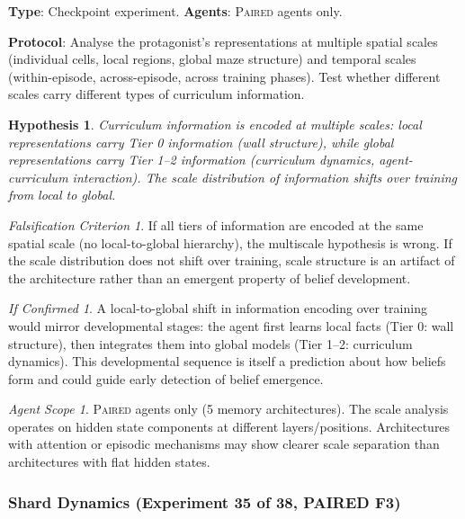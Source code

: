\documentclass[11pt,a4paper]{article}
\newtheorem{hypothesis}{Hypothesis}[subsection]
\theoremstyle{remark}
\newtheorem*{falsification}{Falsification Criterion}
\newtheorem*{implication}{If Confirmed}
\newtheorem*{agentscope}{Agent Scope}
\newcommand{\paired}{\textsc{Paired}}
\begin{document}
\textbf{Type}: Checkpoint experiment. \textbf{Agents}: \paired{} agents only.

\textbf{Protocol}: Analyse the protagonist's representations at multiple spatial scales (individual cells, local regions, global maze structure) and temporal scales (within-episode, across-episode, across training phases). Test whether different scales carry different types of curriculum information.

\begin{hypothesis}
Curriculum information is encoded at multiple scales: local representations carry Tier 0 information (wall structure), while global representations carry Tier 1--2 information (curriculum dynamics, agent-curriculum interaction). The scale distribution of information shifts over training from local to global.
\end{hypothesis}

\begin{falsification}
If all tiers of information are encoded at the same spatial scale (no local-to-global hierarchy), the multiscale hypothesis is wrong. If the scale distribution does not shift over training, scale structure is an artifact of the architecture rather than an emergent property of belief development.
\end{falsification}

\begin{implication}
A local-to-global shift in information encoding over training would mirror developmental stages: the agent first learns local facts (Tier 0: wall structure), then integrates them into global models (Tier 1--2: curriculum dynamics). This developmental sequence is itself a prediction about how beliefs form and could guide early detection of belief emergence.
\end{implication}

\begin{agentscope}
\paired{} agents only (5 memory architectures). The scale analysis operates on hidden state components at different layers/positions. Architectures with attention or episodic mechanisms may show clearer scale separation than architectures with flat hidden states.
\end{agentscope}

\subsubsection{Shard Dynamics (Experiment 35 of 38, PAIRED F3)}
\label{exp:shard_dynamics}
\end{document}
